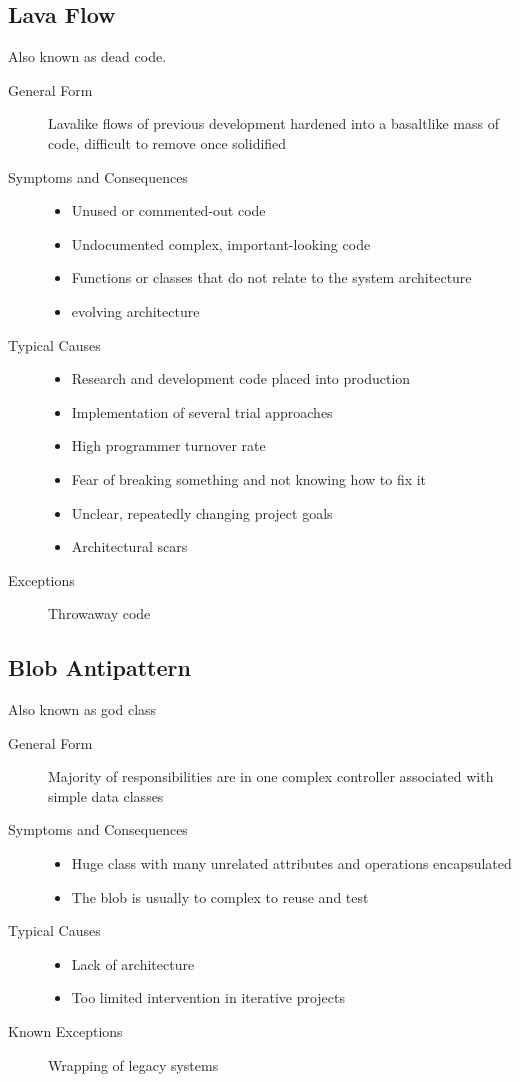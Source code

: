 \subsection{Lava Flow}
Also known as dead code.
\begin{description}
  \item[General Form] Lavalike flows of previous development hardened into a basaltlike mass of code, difficult to remove once solidified
  \item[Symptoms and Consequences] \hfill
  \begin{itemize}
    \item Unused or commented-out code
    \item Undocumented complex, important-looking code
    \item Functions or classes that do not relate to the system architecture
    \item evolving architecture
  \end{itemize}
  \item[Typical Causes] \hfill
  \begin{itemize}
    \item Research and development code placed into production
    \item Implementation of several trial approaches
    \item High programmer turnover rate
    \item Fear of breaking something and not knowing how to fix it
    \item Unclear, repeatedly changing project goals
    \item Architectural scars
  \end{itemize}
  \item[Exceptions] Throwaway code
\end{description}
\newpage

\subsection{Blob Antipattern}
Also known as god class
\begin{description}
  \item[General Form] Majority of responsibilities are in one complex controller associated with simple data classes
  \item[Symptoms and Consequences] \hfill
  \begin{itemize}
    \item Huge class with many unrelated attributes and operations encapsulated
    \item The blob is usually to complex to reuse and test
  \end{itemize}
  \item[Typical Causes] \hfill
  \begin{itemize}
    \item Lack of architecture
    \item Too limited intervention in iterative projects
  \end{itemize}
  \item[Known Exceptions] Wrapping of legacy systems
\end{description}
\newpage
